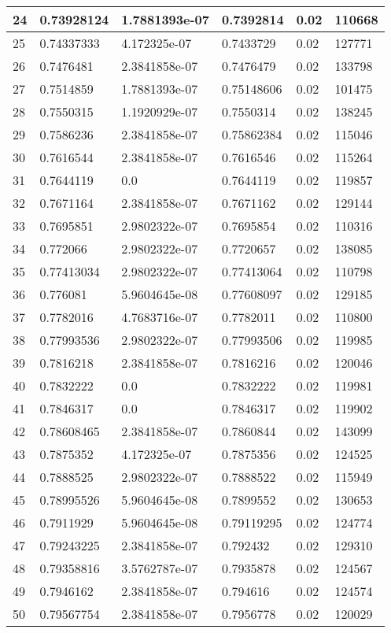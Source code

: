 \begin{longtable}{|l|l|l|l|l|l|}
24 & 0.73928124 & 1.7881393e-07 & 0.7392814 & 0.02 & 110668 \\ \hline 
25 & 0.74337333 & 4.172325e-07 & 0.7433729 & 0.02 & 127771 \\ \hline 
26 & 0.7476481 & 2.3841858e-07 & 0.7476479 & 0.02 & 133798 \\ \hline 
27 & 0.7514859 & 1.7881393e-07 & 0.75148606 & 0.02 & 101475 \\ \hline 
28 & 0.7550315 & 1.1920929e-07 & 0.7550314 & 0.02 & 138245 \\ \hline 
29 & 0.7586236 & 2.3841858e-07 & 0.75862384 & 0.02 & 115046 \\ \hline 
30 & 0.7616544 & 2.3841858e-07 & 0.7616546 & 0.02 & 115264 \\ \hline 
31 & 0.7644119 & 0.0 & 0.7644119 & 0.02 & 119857 \\ \hline 
32 & 0.7671164 & 2.3841858e-07 & 0.7671162 & 0.02 & 129144 \\ \hline 
33 & 0.7695851 & 2.9802322e-07 & 0.7695854 & 0.02 & 110316 \\ \hline 
34 & 0.772066 & 2.9802322e-07 & 0.7720657 & 0.02 & 138085 \\ \hline 
35 & 0.77413034 & 2.9802322e-07 & 0.77413064 & 0.02 & 110798 \\ \hline 
36 & 0.776081 & 5.9604645e-08 & 0.77608097 & 0.02 & 129185 \\ \hline 
37 & 0.7782016 & 4.7683716e-07 & 0.7782011 & 0.02 & 110800 \\ \hline 
38 & 0.77993536 & 2.9802322e-07 & 0.77993506 & 0.02 & 119985 \\ \hline 
39 & 0.7816218 & 2.3841858e-07 & 0.7816216 & 0.02 & 120046 \\ \hline 
40 & 0.7832222 & 0.0 & 0.7832222 & 0.02 & 119981 \\ \hline 
41 & 0.7846317 & 0.0 & 0.7846317 & 0.02 & 119902 \\ \hline 
42 & 0.78608465 & 2.3841858e-07 & 0.7860844 & 0.02 & 143099 \\ \hline 
43 & 0.7875352 & 4.172325e-07 & 0.7875356 & 0.02 & 124525 \\ \hline 
44 & 0.7888525 & 2.9802322e-07 & 0.7888522 & 0.02 & 115949 \\ \hline 
45 & 0.78995526 & 5.9604645e-08 & 0.7899552 & 0.02 & 130653 \\ \hline 
46 & 0.7911929 & 5.9604645e-08 & 0.79119295 & 0.02 & 124774 \\ \hline 
47 & 0.79243225 & 2.3841858e-07 & 0.792432 & 0.02 & 129310 \\ \hline 
48 & 0.79358816 & 3.5762787e-07 & 0.7935878 & 0.02 & 124567 \\ \hline 
49 & 0.7946162 & 2.3841858e-07 & 0.794616 & 0.02 & 124574 \\ \hline 
50 & 0.79567754 & 2.3841858e-07 & 0.7956778 & 0.02 & 120029 \\ \hline 
\end{longtable}